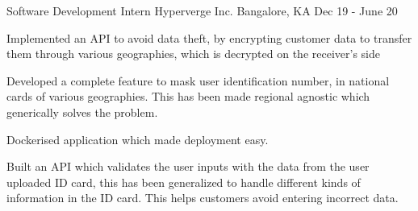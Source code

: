 \begin{cventries}
  \cventry
    {Software Development Intern}
    {Hyperverge Inc.}
    {Bangalore, KA}
    {Dec 19 - June 20}
    {
      \begin{cvitems}
        \item {Implemented an API to avoid data theft, by encrypting customer data to transfer them through various geographies, which is decrypted on the receiver's side}
        \item {Developed a complete feature to mask user identification number, in national cards of various geographies. This has been made regional agnostic which generically solves the problem.}
        \item {Dockerised application which made deployment easy.}
        \item {Built an API which validates the user inputs with the data from the user uploaded ID card, this has been generalized to handle different kinds of information in the ID card. This helps customers avoid entering incorrect data.}
      \end{cvitems}
    }

\end{cventries}
